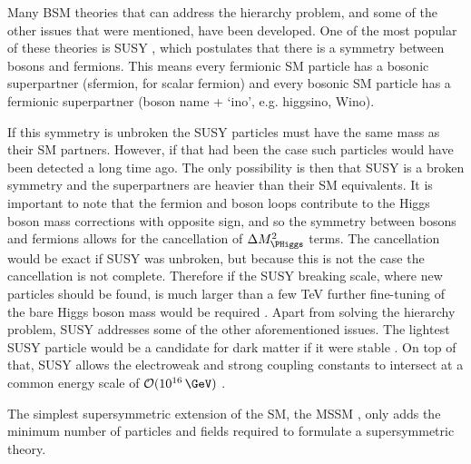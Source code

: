 Many \acf{BSM} theories that can address the hierarchy problem, and some of
the other issues that were mentioned, have been developed.
One of the most
popular of these theories is \acf{SUSY} \cite{SUSY-primer}, which postulates
that there is a symmetry between bosons and fermions. This means every fermionic
\ac{SM} particle has a bosonic superpartner (sfermion, for scalar fermion)
and every bosonic \ac{SM} particle
has a fermionic superpartner (boson name + `ino', e.g. higgsino, Wino).

If this symmetry is unbroken the \ac{SUSY} particles must
have the same mass as their \ac{SM} partners. However, if that had 
been the case such particles would have been detected a long time ago. The 
only possibility is then that \ac{SUSY} is a broken symmetry and the superpartners
are heavier than their \ac{SM} equivalents. It is important to note
that the fermion and boson loops contribute to the Higgs boson
mass corrections with opposite sign, and so the symmetry between bosons and fermions 
allows for the cancellation of $\Delta M_{\PHiggs}^2$ terms. The cancellation
would be exact if \ac{SUSY} was unbroken, but because this is not the case the
cancellation is not complete. Therefore if the \ac{SUSY} breaking scale, where
new particles should be found, is much larger than a few TeV further fine-tuning of
the bare Higgs boson mass would be required \cite{MSSM-carena-haber,SUSY-primer}.
Apart from solving the hierarchy problem, \ac{SUSY} addresses some
of the other aforementioned issues. The lightest \ac{SUSY} particle
would be a candidate for dark matter if it were stable \cite{SUSY-primer}. On top of that,
\ac{SUSY} allows the electroweak and strong coupling
constants to intersect at a common energy scale of $\mathcal{O}(10^{16}\,\GeV)$ \cite{GUT-LEP}. 

The simplest supersymmetric extension of the \ac{SM}, the \ac{MSSM} \cite{SUSY-primer}, only adds the minimum
number of particles and fields required to formulate a supersymmetric theory.

